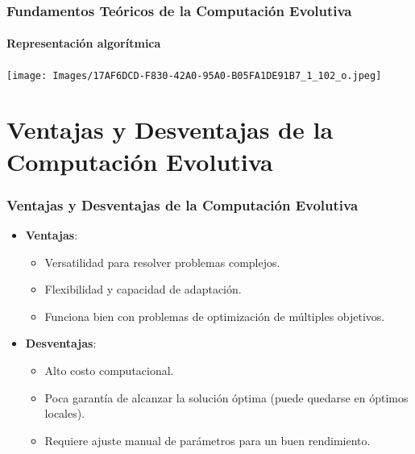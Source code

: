 \documentclass[
	11pt, %
]{beamer}
\begin{document}
\begin{frame}
	\frametitle{Fundamentos Teóricos de la Computación Evolutiva}
	\framesubtitle{Representación algorítmica}
        \begin{center}
            \texttt{[image: Images/17AF6DCD-F830-42A0-95A0-B05FA1DE91B7\_1\_102\_o.jpeg]}
        \end{center}
\end{frame}

\section{Ventajas y Desventajas de la Computación Evolutiva}
\begin{frame}
    \frametitle{Ventajas y Desventajas de la Computación Evolutiva}
    \begin{itemize}
        \item \textbf{Ventajas}:
        \begin{itemize}
            \item Versatilidad para resolver problemas complejos.
            \item Flexibilidad y capacidad de adaptación.
            \item Funciona bien con problemas de optimización de múltiples objetivos.
        \end{itemize}
        \item \textbf{Desventajas}:
        \begin{itemize}
            \item Alto costo computacional.
            \item Poca garantía de alcanzar la solución óptima (puede quedarse en óptimos locales).
            \item Requiere ajuste manual de parámetros para un buen rendimiento.
        \end{itemize}
    \end{itemize}
\end{frame}
\end{document}
